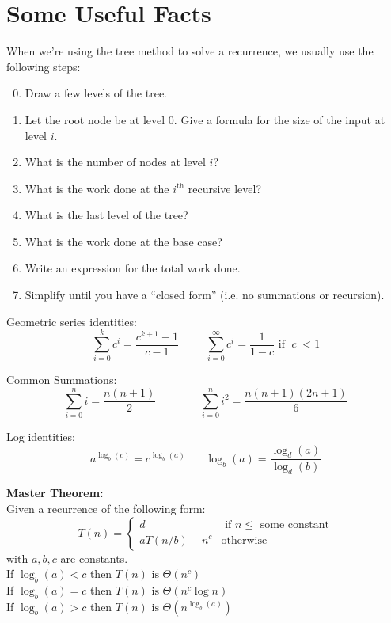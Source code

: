\documentclass[12pt]{article}
\begin{document}
\newpage
\section*{Some Useful Facts}
When we're using the tree method to solve a recurrence, we usually use the following steps:
\begin{enumerate}
	\setcounter{enumi}{-1}
	\item Draw a few levels of the tree.
	\item Let the root node be at level $0$. Give a formula for the size of the input at level $i$. 
	\item What is the number of nodes at level $i$? 
	\item What is the work done at the $i^{\text{th}}$ recursive level? 
	\item What is the last level of the tree? 
	\item What is the work done at the base case? 
	\item Write an expression for the total work done. 
	\item Simplify until you have a ``closed form'' (i.e. no summations or recursion).
\end{enumerate}


Geometric series identities:
\[ \sum_{i=0}^k c^i = \frac{c^{k+1} - 1}{c-1} ~~~~~~~~~~~ \sum_{i=0}^{\infty} c^i = \frac{1}{1-c} \text{ if } |c| < 1\]

Common Summations:
\[ \sum_{i=0}^n i = \frac{n(n+1)}{2} ~~~~~~~~~~~~~~~~~~    \sum_{i=0}^n i^2 = \frac{n(n+1)(2n+1)}{6} \]

Log identities:
\[ a^{\log_b(c)} = c^{\log_b(a)} ~~~~~~~~ \log_b(a) = \frac{\log_d(a)}{\log_d(b)}\]

\textbf{Master Theorem:}\\
Given a recurrence of the following form:
\[ T(n) = \begin{cases} d &\text{ if } n \leq \text{ some constant}\\
			aT(n/b) + n^c &\text{otherwise}
			\end{cases} \]
with $a,b,c$ are constants. \\
If $\log_b(a) < c$ then $T(n) \text{ is } \Theta(n^c)$\\
If $\log_b(a) = c$ then $T(n) \text{ is } \Theta(n^c\log n)$\\
If $\log_b(a) > c$ then $T(n) \text{ is } \Theta\left(n^{\log_b(a)}\right)$
\end{document}
